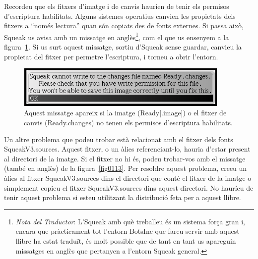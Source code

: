 Recordeu que els fitxers d'imatge i de canvis haurien de tenir els permisos d'escriptura habilitats. Alguns sistemes operatius canvien les propietats dels fitxers a ``només lectura'' quan són copiats des de fonts externes. Si passa això, Squeak us avisa amb un missatge en anglès\footnote{\emph{Nota del Traductor}: L'Squeak amb què treballeu és un sistema força gran i, encara que pràcticament tot l'entorn BotsInc que fareu servir amb aquest llibre ha estat traduït, és molt possible que de tant en tant us apareguin missatges en anglès que pertanyen a l'entorn Squeak general.}, com el que us ensenyem a la figura~\ref{fig0112}. Si us surt aquest missatge, sortiu d'Squeak sense guardar, canvieu la propietat del fitxer per permetre l'escriptura, i torneu a obrir l'entorn.  

\begin{figure}[h]
\begin{center}
\includegraphics[height=20mm ,width=103mm ]{Imatges/figura1-12.png}
\end{center}
\caption{Aquest missatge apareix si la imatge (\textsf{\upshape Ready}[\textsf{\upshape .image}]) o el fitxer de canvis (\textsf{\upshape Ready.changes}) no tenen els permisos d'escriptura habilitats.}
\label{fig0112}
\end{figure}

Un altre problema que podeu trobar està relacionat amb el fitxer dels fonts \textsf{SqueakV3.sources}. Aquest fitxer, o un àlies referenciant-lo, hauria d'estar present al directori de la imatge. Si el fitxer no hi és, podeu trobar-vos amb el missatge (també en anglès) de la figura~\ref{fig0113}. Per resoldre aquest problema, creeu un àlies al fitxer \textsf{SqueakV3.sources} dins el directori que conté el fitxer de la imatge o simplement copieu el fitxer \textsf{SqueakV3.sources} dins aquest directori. No hauríeu de tenir aquest problema si esteu utilitzant la distribució feta per a aquest llibre.

\vspace*{5mm}

